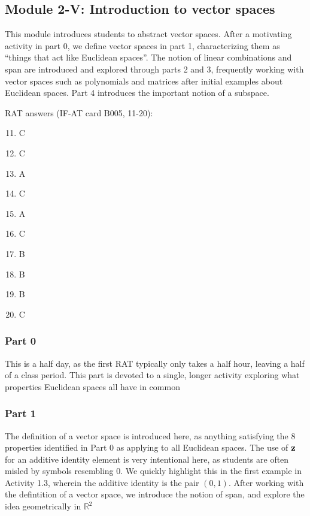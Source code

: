 \documentclass{article}
\begin{document}
\subsection*{Module 2-V: Introduction to vector spaces}
This module introduces students to abstract vector spaces.  After a motivating activity in part 0, we define vector spaces in part 1, characterizing them as ``things that act like Euclidean spaces''.  The notion of linear combinations and span are introduced and explored through parts 2 and 3, frequently working with vector spaces such as polynomials and matrices after initial examples about Euclidean spaces.  Part 4 introduces the important notion of a subspace.

RAT answers (IF-AT card B005, 11-20):
\begin{multicols}{10}
\begin{enumerate}[1)]
\setcounter{enumi}{10}
\item C
\item C
\item A
\item C
\item A
\item C
\item B
\item B
\item B
\item C
\end{enumerate}
\end{multicols}

\subsubsection*{Part 0}
This is a half day, as the first RAT typically only takes a half hour, leaving a half of a class period.  This part is devoted to a single, longer activity exploring what properties Euclidean spaces all have in common

\subsubsection*{Part 1}
The definition of a vector space is introduced here, as anything satisfying the 8 properties identified in Part 0 as applying to all Euclidean spaces.  The use of $\bf{z}$ for an additive identity element is very intentional here, as students are often misled by symbols resembling $0$.  We quickly highlight this in the first example in Activity 1.3, wherein the additive identity is the pair $(0,1)$.  After working with the defintition of a vector space, we introduce the notion of span, and explore the idea geometrically in $\mathbb{R}^2$
\end{document}
